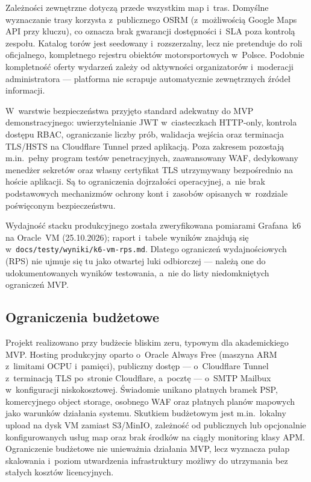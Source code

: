 \documentclass{sprz}
\begin{document}
Zależności zewnętrzne dotyczą przede wszystkim map i~tras. Domyślne wyznaczanie trasy korzysta z~publicznego OSRM (z~możliwością Google Maps API przy kluczu), co oznacza brak gwarancji dostępności i~SLA poza kontrolą zespołu. Katalog torów jest seedowany i~rozszerzalny, lecz nie pretenduje do roli oficjalnego, kompletnego rejestru obiektów motorsportowych w~Polsce. Podobnie kompletność oferty wydarzeń zależy od aktywności organizatorów i~moderacji administratora --- platforma nie scrapuje automatycznie zewnętrznych źródeł informacji.

W~warstwie bezpieczeństwa przyjęto standard adekwatny do MVP demonstracyjnego: uwierzytelnianie JWT w~ciasteczkach HTTP-only, kontrola dostępu RBAC, ograniczanie liczby prób, walidacja wejścia oraz terminacja TLS/HSTS na Cloudflare Tunnel przed aplikacją. Poza zakresem pozostają m.in.\ pełny program testów penetracyjnych, zaawansowany WAF, dedykowany menedżer sekretów oraz własny certyfikat TLS utrzymywany bezpośrednio na hoście aplikacji. Są to ograniczenia dojrzałości operacyjnej, a~nie brak podstawowych mechanizmów ochrony kont i~zasobów opisanych w~rozdziale poświęconym bezpieczeństwu.

Wydajność stacku produkcyjnego została zweryfikowana pomiarami Grafana~k6~\cite{k6:docs} na Oracle~VM (25.10.2026); raport i~tabele wyników znajdują się w~\texttt{docs/\allowbreak testy/\allowbreak wyniki/\allowbreak k6-vm-rps.md}. Dlatego ograniczeń wydajnościowych (RPS) nie ujmuje się tu jako otwartej luki odbiorczej --- należą one do udokumentowanych wyników testowania, a~nie do listy niedomkniętych ograniczeń MVP.

\subsection{Ograniczenia budżetowe}
Projekt realizowano przy budżecie bliskim zeru, typowym dla akademickiego MVP. Hosting produkcyjny oparto o~Oracle Always Free (maszyna ARM z~limitami OCPU i~pamięci), publiczny dostęp --- o~Cloudflare Tunnel z~terminacją TLS po~stronie Cloudflare, a~pocztę --- o~SMTP Mailbux w~konfiguracji niskokosztowej. Świadomie unikano płatnych bramek PSP, komercyjnego object storage, osobnego WAF oraz płatnych planów mapowych jako warunków działania systemu. Skutkiem budżetowym jest m.in.\ lokalny upload na dysk VM zamiast S3/MinIO, zależność od publicznych lub opcjonalnie konfigurowanych usług map oraz brak środków na ciągły monitoring klasy APM. Ograniczenie budżetowe nie unieważnia działania MVP, lecz wyznacza pułap skalowania i~poziom utwardzenia infrastruktury możliwy do utrzymania bez stałych kosztów licencyjnych.
\end{document}
